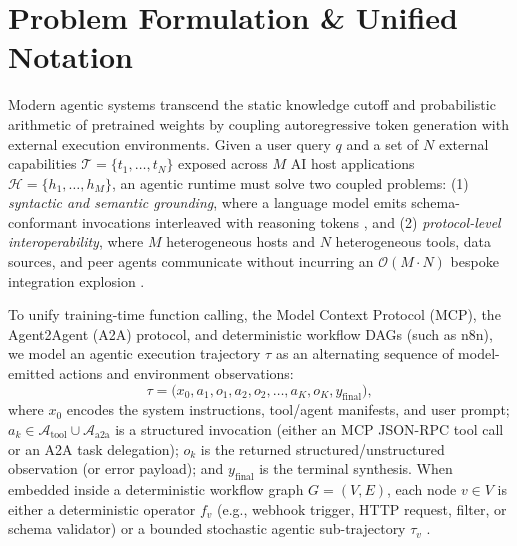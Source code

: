 \documentclass[../../../../master.tex]{subfiles}
\begin{document}

\section{Problem Formulation \& Unified Notation}
\label{sec:mcp:formulation}

Modern agentic systems transcend the static knowledge cutoff and probabilistic arithmetic of pretrained weights by coupling autoregressive token generation with external execution environments. Given a user query $q$ and a set of $N$ external capabilities $\mathcal{T} = \{t_1, \dots, t_N\}$ exposed across $M$ AI host applications $\mathcal{H} = \{h_1, \dots, h_M\}$, an agentic runtime must solve two coupled problems: (1) \emph{syntactic and semantic grounding}, where a language model emits schema-conformant invocations interleaved with reasoning tokens , and (2) \emph{protocol-level interoperability}, where $M$ heterogeneous hosts and $N$ heterogeneous tools, data sources, and peer agents communicate without incurring an $\mathcal{O}(M \cdot N)$ bespoke integration explosion .

To unify training-time function calling, the Model Context Protocol (MCP), the Agent2Agent (A2A) protocol, and deterministic workflow DAGs (such as n8n), we model an agentic execution trajectory $\tau$ as an alternating sequence of model-emitted actions and environment observations:
\begin{equation}
  \tau = \bigl(x_0, a_1, o_1, a_2, o_2, \dots, a_K, o_K, y_{\text{final}}\bigr),
  \label{eq:mcp:trajectory}
\end{equation}
where $x_0$ encodes the system instructions, tool/agent manifests, and user prompt; $a_k \in \mathcal{A}_{\text{tool}} \cup \mathcal{A}_{\text{a2a}}$ is a structured invocation (either an MCP JSON-RPC tool call or an A2A task delegation); $o_k$ is the returned structured/unstructured observation (or error payload); and $y_{\text{final}}$ is the terminal synthesis. When embedded inside a deterministic workflow graph $G = (V, E)$, each node $v \in V$ is either a deterministic operator $f_v$ (e.g., webhook trigger, HTTP request, filter, or schema validator) or a bounded stochastic agentic sub-trajectory $\tau_v$ .
\end{document}
